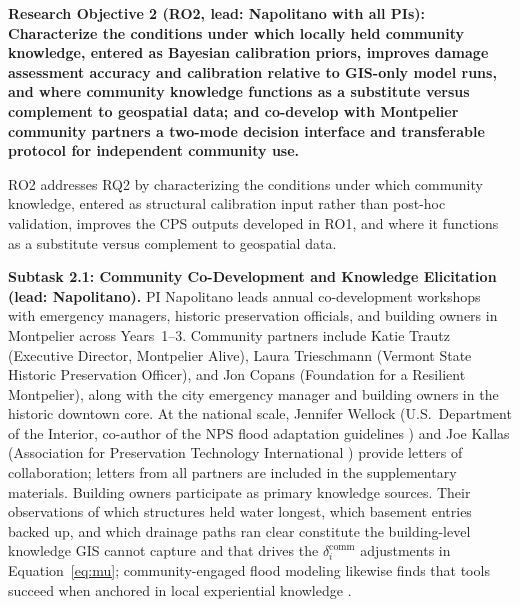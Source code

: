 \documentclass[11pt]{article}
\begin{document}
\vspace{5pt}
\begin{tcolorbox}[colback=rootwocol!55,colframe=black,boxrule=1pt,coltext=black,
  left=1mm,right=1mm,top=1mm,bottom=1mm]
\textbf{Research Objective 2 (RO2, lead: Napolitano with all PIs): Characterize
the conditions under which locally held community knowledge, entered as Bayesian
calibration priors, improves damage assessment accuracy and calibration relative
to GIS-only model runs, and where community knowledge functions as a substitute
versus complement to geospatial data; and co-develop with Montpelier community
partners a two-mode decision interface and transferable protocol for independent
community use.}
\end{tcolorbox}


RO2 addresses RQ2 by characterizing the conditions under which community knowledge,
entered as structural calibration input rather than post-hoc validation, improves
the CPS outputs developed in RO1, and where it functions as a substitute versus
complement to geospatial data.

\textbf{Subtask 2.1: Community Co-Development and Knowledge Elicitation
(lead: Napolitano).}
PI Napolitano leads annual co-development workshops with emergency managers, historic
preservation officials, and building owners in Montpelier across Years~1--3.
Community partners include Katie Trautz (Executive Director, Montpelier Alive),
Laura Trieschmann (Vermont State Historic Preservation Officer),
and Jon Copans (Foundation for a Resilient Montpelier),
along with the city emergency manager and building owners
in the historic downtown core.
At the national scale, Jennifer Wellock (U.S.\ Department of the Interior,
co-author of the NPS flood adaptation guidelines \cite{NPS2021})
and Joe Kallas (Association for Preservation Technology International \cite{kallas2024})
provide letters of collaboration; letters from all partners are included
in the supplementary materials.
Building owners participate as primary knowledge sources. Their observations of which structures held water longest, which basement entries backed up, and which drainage paths ran clear constitute the building-level knowledge GIS cannot capture and that drives the $\delta_i^{\mathrm{comm}}$ adjustments in Equation~\eqref{eq:mu}; community-engaged flood modeling likewise finds that tools succeed when anchored in local experiential knowledge \cite{skilton2022dontwant,habib2026sustaining}.
\end{document}
